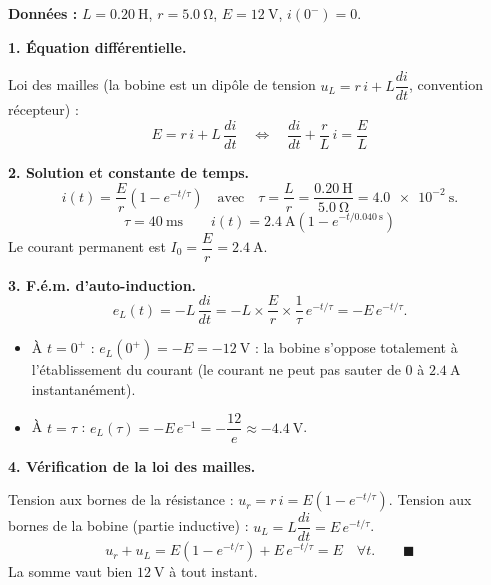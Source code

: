 \documentclass[11pt]{article}
\begin{document}
\begin{corrige}
\textbf{Données :} $L = \SI{0,20}{\henry}$, $r = \SI{5,0}{\ohm}$, $E = \SI{12}{\volt}$, $i(0^-) = 0$.

\textbf{1. Équation différentielle.}

Loi des mailles (la bobine est un dipôle de tension $u_L = r\,i + L\dfrac{di}{dt}$, convention récepteur) :
\[
E = r\,i + L\,\dfrac{di}{dt} \quad\Longleftrightarrow\quad \boxed{\dfrac{di}{dt} + \dfrac{r}{L}\,i = \dfrac{E}{L}}
\]

\textbf{2. Solution et constante de temps.}
\[
i(t) = \dfrac{E}{r}\left(1 - e^{-t/\tau}\right) \quad\text{avec}\quad \tau = \dfrac{L}{r} = \dfrac{\SI{0,20}{\henry}}{\SI{5,0}{\ohm}} = \SI{4,0e-2}{\second}.
\]
\[
\boxed{\tau = \SI{40}{\milli\second}} \qquad i(t) = \SI{2,4}{\ampere}\left(1 - e^{-t/\SI{0,040}{\second}}\right)
\]
Le courant permanent est $I_0 = \dfrac{E}{r} = \SI{2,4}{\ampere}$.

\textbf{3. F.é.m. d'auto-induction.}
\[
e_L(t) = -L\,\dfrac{di}{dt} = -L\times\dfrac{E}{r}\times\dfrac{1}{\tau}\,e^{-t/\tau} = -E\,e^{-t/\tau}.
\]
\begin{itemize}
    \item À $t = 0^+$ : $e_L(0^+) = -E = \boxed{-\SI{12}{\volt}}$ : la bobine s'oppose totalement à l'établissement du courant (le courant ne peut pas sauter de 0 à $\SI{2,4}{\ampere}$ instantanément).
    \item À $t = \tau$ : $e_L(\tau) = -E\,e^{-1} = -\dfrac{12}{e} \approx \boxed{-\SI{4,4}{\volt}}$.
\end{itemize}

\textbf{4. Vérification de la loi des mailles.}

Tension aux bornes de la résistance : $u_r = r\,i = E\left(1 - e^{-t/\tau}\right)$.
Tension aux bornes de la bobine (partie inductive) : $u_L = L\dfrac{di}{dt} = E\,e^{-t/\tau}$.
\[
u_r + u_L = E\left(1 - e^{-t/\tau}\right) + E\,e^{-t/\tau} = E \quad \forall t. \qquad \blacksquare
\]
La somme vaut bien $\SI{12}{\volt}$ à tout instant.
\end{corrige}
\end{document}
